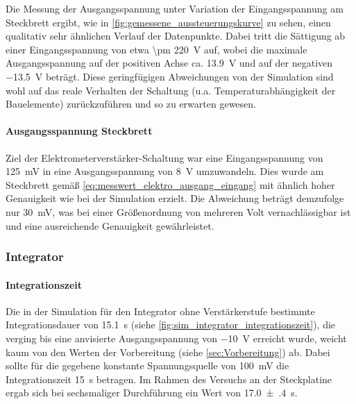 \documentclass[12pt,english,ngerman]{scrartcl}
\begin{document}
Die Messung der Ausgangsspannung unter Variation der Eingangsspannung am
Steckbrett ergibt, wie in \autoref{fig:gemessene_aussteuerungskurve} zu sehen,
einen qualitativ sehr ähnlichen Verlauf der Datenpunkte. 
Dabei tritt die Sättigung ab einer Eingangsspannung von etwa \SI{\pm
220}{\volt} auf, wobei die maximale Ausgangsspannung auf der positiven Achse
ca. \SI{13,9}{\volt} und auf der negativen \SI{-13,5}{\volt} beträgt. Diese
geringfügigen Abweichungen von der Simulation sind wohl auf das reale Verhalten
der Schaltung (u.a. Temperaturabhängigkeit der Bauelemente) zurückzuführen und
so zu erwarten gewesen.

\paragraph{Ausgangsspannung Steckbrett}
Ziel der Elektrometerverstärker-Schaltung war eine Eingangsspannung von
\SI{125}{\milli\volt} in eine Ausgangsspannung von \SI{8}{\volt} umzuwandeln.
Dies wurde am Steckbrett gemäß \autoref{eq:messwert_elektro_ausgang_eingang}
mit ähnlich hoher Genauigkeit wie bei der Simulation erzielt. Die Abweichung
beträgt demzufolge nur \SI{30}{\milli\volt}, was bei einer Größenordnung von
mehreren Volt vernachlässigbar ist und eine ausreichende Genauigkeit
gewährleistet.

\subsubsection{Integrator}
\paragraph{Integrationszeit}
Die in der Simulation für den Integrator ohne Verstärkerstufe bestimmte
Integrationsdauer von \SI{15,1}{\second} (siehe
\autoref{fig:sim_integrator_integrationszeit}), die verging bis eine anvisierte
Ausgangsspannung von \SI{-10}{\volt} erreicht wurde, weicht kaum von den Werten
der Vorbereitung (siehe \autoref{sec:Vorbereitung}) ab. Dabei sollte für die
gegebene konstante Spannungsquelle von \SI{100}{\milli\volt} die
Integrationszeit \SI{15}{\second} betragen. Im Rahmen des Versuchs an der
Steckplatine ergab sich bei sechsmaliger Durchführung ein Wert von
\SI{17.0(4)}{\second}.
\end{document}
